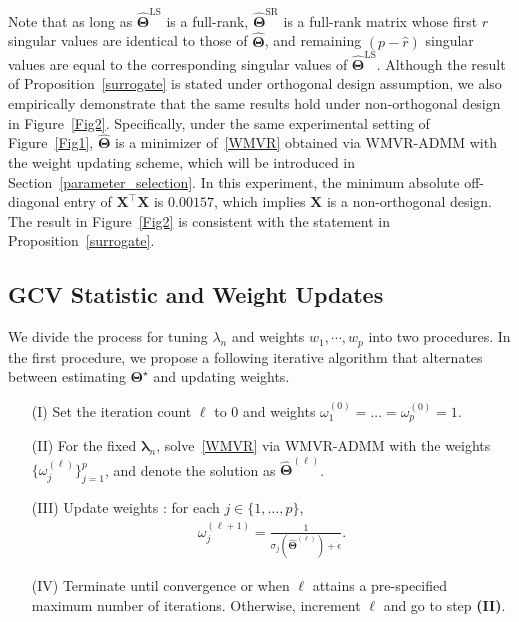 \documentclass[alpha-refs]{wiley-article}
\begin{document}
Note that as long as $\widehat{\boldsymbol{\Theta}}^{\text{LS}}$ is a full-rank, $\widehat{\boldsymbol{\Theta}}^{\text{SR}}$ is a full-rank matrix whose first $\widehat{r}$ singular values are identical to those of $\widehat{\boldsymbol{\Theta}}$, and remaining $(p-\widehat{r})$ singular values are equal to the  corresponding singular values of $\widehat{\boldsymbol{\Theta}}^{\text{LS}}$.
Although the result of Proposition~\ref{surrogate} is stated under orthogonal design assumption, we also empirically demonstrate that the same results hold under non-orthogonal design in Figure~\ref{Fig2}.
Specifically, under the same experimental setting of Figure~\ref{Fig1}, $\widehat{\boldsymbol{\Theta}}$ is a minimizer of~\eqref{WMVR} obtained via WMVR-ADMM with the weight updating scheme, which will be introduced in Section~\ref{parameter_selection}.
In this experiment, the minimum absolute off-diagonal entry of $\boldsymbol{X}^{\top}\boldsymbol{X}$ is $0.00157$, which implies $\boldsymbol{X}$ is a non-orthogonal design.
The result in Figure~\ref{Fig2} is consistent with the statement in Proposition~\ref{surrogate}.

\subsection{GCV Statistic and Weight Updates}
We divide the process for tuning $\lambda_{n}$ and weights $w_{1}, \cdots, w_{p}$ into two procedures.
In the first procedure, we propose a following iterative algorithm that alternates between estimating $\boldsymbol{\Theta}^{\star}$ and updating weights.
\begin{enumerate}
    \item[(I)] Set the iteration count $\ell$ to $0$ and weights $\omega_{1}^{(0)}=\dots=\omega_{p}^{(0)}=1$. 
    \item[(II)] For the fixed $\boldsymbol{\lambda}_{n}$, solve~\eqref{WMVR} via WMVR-ADMM with the weights $\{\omega_{j}^{(\ell)}\}_{j=1}^{p}$, and denote the solution as  $\widehat{\boldsymbol{\Theta}}^{(\ell)}$. 
    \item[(III)] Update weights : for each $j\in\{1,\dots,p\}$,
    \begin{align} \label{weight}
        \omega_{j}^{(\ell+1)}=\frac{1}{\sigma_{j}(\widehat{\boldsymbol{\Theta}}^{(\ell)})+\epsilon}.
    \end{align}
    \item[(IV)] Terminate until convergence or when $\ell$ attains a pre-specified maximum number of iterations. 
    Otherwise, increment $\ell$ and go to step {\bf(II)}.
\end{enumerate}
\end{document}
